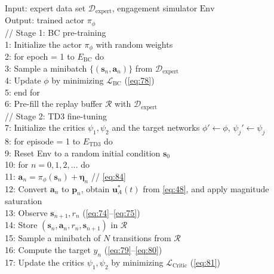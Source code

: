 \begin{algorithm}[H]
\caption{Offline BC-TD3 training for guidance-parameter optimization}
\label{alg:bctd3}
{\footnotesize
\raggedright
Input: expert data set \(\mathcal{D}_{\text{expert}}\), engagement simulator \(\text{Env}\)\\
Output: trained actor \(\pi_\phi\)\\
// Stage 1: BC pre-training\\
1: Initialize the actor \(\pi_\phi\) with random weights\\
2: for epoch = 1 to \(E_{\text{BC}}\) do\\
3: \quad Sample a minibatch \(\{(\boldsymbol{s}_n, \boldsymbol{a}_n)\}\) from \(\mathcal{D}_{\text{expert}}\)\\
4: \quad Update \(\phi\) by minimizing \(\mathcal{L}_{\text{BC}}\) (\ref{eq:78})\\
5: end for\\
6: Pre-fill the replay buffer \(\mathcal{R}\) with \(\mathcal{D}_{\text{expert}}\)\\
// Stage 2: TD3 fine-tuning\\
7: Initialize the critics \(\psi_1, \psi_2\) and the target networks \(\phi' \leftarrow \phi\), \(\psi_j' \leftarrow \psi_j\)\\
8: for episode = 1 to \(E_{\text{TD3}}\) do\\
9: \quad Reset Env to a random initial condition \(\boldsymbol{s}_0\)\\
10: \quad for \(n = 0, 1, 2, \ldots\) do\\
11: \quad\quad \(\boldsymbol{a}_n = \pi_\phi(\boldsymbol{s}_n) + \boldsymbol{\eta}_n\) \hfill // \ref{eq:84}\\
12: \quad\quad Convert \(\boldsymbol{a}_n\) to \(\boldsymbol{p}_n\), obtain \(\boldsymbol{u}_A^*(t)\) from \eqref{eq:48}, and apply magnitude saturation\\
13: \quad\quad Observe \(\boldsymbol{s}_{n+1}, r_n\) (\ref{eq:74}--\ref{eq:75})\\
14: \quad\quad Store \((\boldsymbol{s}_n, \boldsymbol{a}_n, r_n, \boldsymbol{s}_{n+1})\) in \(\mathcal{R}\)\\
15: \quad\quad Sample a minibatch of \(N\) transitions from \(\mathcal{R}\)\\
16: \quad\quad Compute the target \(y_n\) (\ref{eq:79}--\ref{eq:80})\\
17: \quad\quad Update the critics \(\psi_1, \psi_2\) by minimizing \(\mathcal{L}_{\text{Critic}}\) (\ref{eq:81})\\
}
\end{algorithm}
